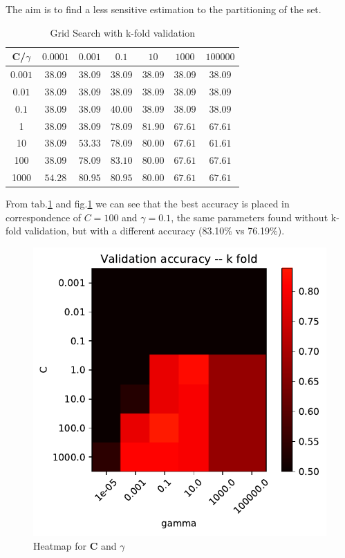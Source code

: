 \documentclass[10pt,a4paper]{article}
\begin{document}
The aim is to find a less sensitive estimation to the partitioning of the set.    

\begin{table}[h]
	\centering
	\begin{tabular}{c | c c c c c c}
		\toprule
		\textbf{C}/$\gamma$ & $0.0001$ & $0.001$ & $0.1$ & $10$ & $1000$ & $100000$ \\
		\midrule 
		$0.001$ & $38.09$ & $38.09$ & $38.09$ & $38.09$ & $38.09$ & $38.09$ \\
		$0.01$  & $38.09$ & $38.09$ & $38.09$ & $38.09$ & $38.09$ & $38.09$ \\
		$0.1$  & $38.09$ & $38.09$ & $40.00$ & $38.09$ & $38.09$ & $38.09$ \\
		1 & $38.09$ & $38.09$ & $78.09$ & ${81.90}$ & $67.61$ & $67.61$ \\
		10 & $38.09$ & $53.33$ & 78.09  & $80.00$ & $67.61$ & $61.61$ \\
		100 & $38.09$ & $78.09$ & $\mathbf{83.10}$ & $80.00$ & $67.61$ & $67.61$ \\
		1000 & $54.28$ & $80.95$ & $80.95$ & $80.00$ & $67.61$ & $67.61$ \\
		\bottomrule
	\end{tabular}
	\caption{Grid Search with k-fold validation}\label{Grid_search_k}
\end{table}

From tab.\ref{Grid_search_k} and fig.\ref{fig:validation_accuracy_k} we can see that the best accuracy is placed in correspondence of $C=100$ and $\gamma=0.1$, the same parameters found without k-fold validation, but with a different accuracy (83.10\% vs 76.19\%).

\begin{figure}[h]
\centering
\includegraphics[width=0.7\linewidth]{../Images/validation_accuracy_k}
\caption{Heatmap for \textbf{C} and $\gamma$}
\label{fig:validation_accuracy_k}
\end{figure}
\end{document}
